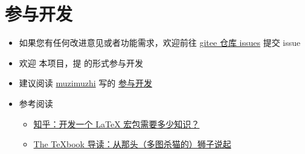
\section{参与开发}

\begin{itemize}
  \item 如果您有任何改进意见或者功能需求，欢迎前往 \href{https://gitee.com/zepinglee/exam-zh/issues}{gitee 仓库 issues} 提交 issue
  \item 欢迎  本项目，提  的形式参与开发
  \item 建议阅读 \href{https://zhuanlan.zhihu.com/typography-and-latex/}{muzimuzhi} 写的 \href{https://gitee.com/ustctug/ustcthesis/wiki/%E5%8F%82%E4%B8%8E%E5%BC%80%E5%8F%91}{参与开发}
  \item 参考阅读
    \begin{itemize}
      \item \href{https://www.zhihu.com/question/27017364/answer/34932199}{知乎：开发一个 LaTeX 宏包需要多少知识？}
      \item \href{https://zhuanlan.zhihu.com/p/19669122}{The TeXbook 导读：从那头（多图杀猫的）狮子说起}
    \end{itemize}
\end{itemize}